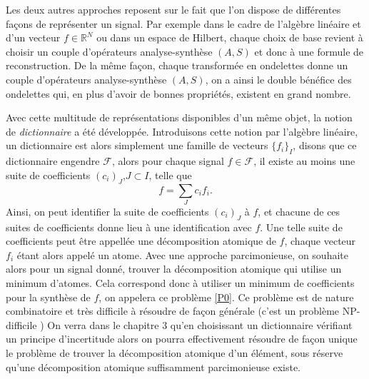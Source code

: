 Les deux autres approches reposent sur le fait que l'on dispose de différentes façons de représenter un signal.
Par exemple dans le cadre de l'algèbre linéaire et d'un vecteur $f \in \mathbb{R}^N$ ou dans un espace de Hilbert, chaque choix de base revient à choisir un couple d'opérateurs analyse-synthèse $(A, S)$ et donc à une formule de reconstruction.
De la même façon, chaque transformée en ondelettes donne un couple d'opérateurs analyse-synthèse $(A, S)$, on a ainsi le double bénéfice des ondelettes qui, en plus d'avoir de bonnes propriétés, existent en grand nombre.
\newline

Avec cette multitude de représentations disponibles d'un même objet, la notion de \emph{dictionnaire} a été développée.
Introduisons cette notion par l'algèbre linéaire, un dictionnaire est alors simplement une famille de vecteurs $\{f_i\}_I$, disons que ce dictionnaire engendre $\mathcal{F}$, alors pour chaque signal $f\in\mathcal{F}$, il existe au moins une suite de coefficients $(c_i)_J$,$J\subset I$, telle que
\begin{equation}
	f = \sum_J c_i f_i.
\end{equation}
Ainsi, on peut identifier la suite de coefficients $(c_i)_J$ à $f$, et chacune de ces suites de coefficients donne lieu à une identification avec $f$.
Une telle suite de coefficients peut être appellée une décomposition atomique de $f$, chaque vecteur $f_i$ étant alors appelé un atome.
Avec une approche parcimonieuse, on souhaite alors pour un signal donné, trouver la décomposition atomique qui utilise un minimum d'atomes. 
Cela correspond donc à utiliser un minimum de coefficients pour la synthèse de $f$, on appelera ce problème \ref{P0}.
\newline
Ce problème est de nature combinatoire et très difficile à résoudre de façon générale (c'est un problème NP-difficile \cite{NPHard})
On verra dans le chapitre 3 qu'en choisissant un dictionnaire vérifiant un principe d'incertitude alors on pourra effectivement résoudre de façon unique le problème de trouver la décomposition atomique d'un élément, sous réserve qu'une décomposition atomique suffisamment parcimonieuse existe.  
\newline

